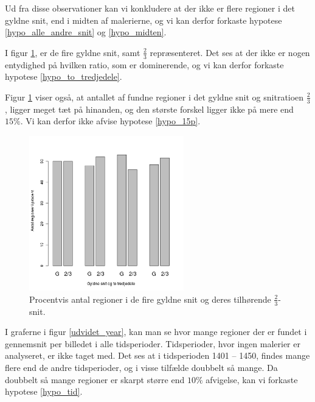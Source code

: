{Ud fra disse observationer kan vi konkludere at der ikke er flere
regioner i det gyldne snit, end i midten af malerierne, og vi kan derfor
forkaste hypotese \ref{hypo_alle_andre_snit} og \ref{hypo_midten}.

I figur \ref{G_vs_to_trejedele_udvidet}, er de fire gyldne snit, samt
$\frac{2}{3}$ repræsenteret. Det ses at der ikke er nogen entydighed på
hvilken ratio, som er dominerende, og vi kan derfor forkaste hypotese
\ref{hypo_to_tredjedele}.

Figur \ref{G_vs_to_trejedele_udvidet} viser også, at antallet af fundne
regioner i det gyldne snit og snitratioen $\frac{2}{3}$, ligger meget
tæt på hinanden, og den største forskel ligger ikke på mere end $15\%$.
Vi kan derfor ikke afvise hypotese \ref{hypo_15p}.

\begin{figure}[h!]
	\begin{center}
		\includegraphics[width=0.6\textwidth]{afsnit/resultater/billeder/G_vs_to_tredjedeleU.png}
	\end{center}
	\caption{Procentvis antal regioner i de fire gyldne snit og deres
    tilhørende $\frac{2}{3}$-snit.}
	\label{G_vs_to_trejedele_udvidet}
\end{figure}

I graferne i figur \ref{udvidet_year}, kan man se hvor mange regioner
der er fundet i gennemsnit per billedet i alle tidsperioder.
Tidsperioder, hvor ingen malerier er analyseret, er ikke taget med. Det
ses at i tidsperioden 1401 -- 1450, findes mange flere end de andre
tidsperioder, og i visse tilfælde doubbelt så mange. Da doubbelt så
mange regioner er skarpt større end $10\%$ afvigelse, kan vi forkaste
hypotese \ref{hypo_tid}.

}
